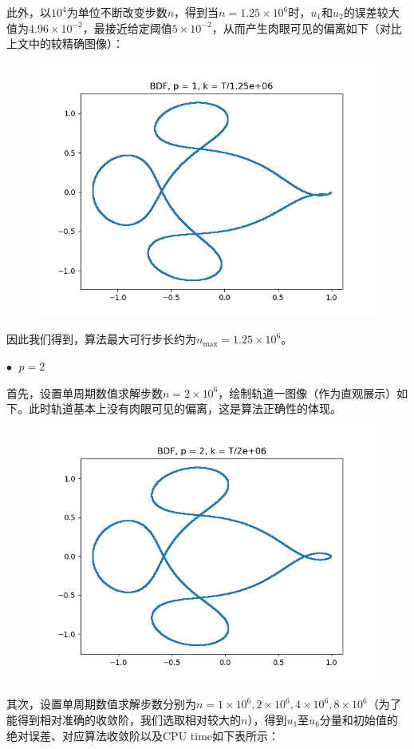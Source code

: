 \documentclass{ctexart}
\begin{document}
\begin{sloppypar}
此外，以$10^4$为单位不断改变步数$n$，得到当$n = 1.25 \times 10^6$时，$u_1$和$u_2$的误差较大值为$4.96 \times 10^{-2}$，最接近给定阈值$5 \times 10^{-2}$，从而产生肉眼可见的偏离如下（对比上文中的较精确图像）：
\begin{figure}[H]
\centering
\includegraphics[scale = 0.45]{./report_src/Figure_18.png}
\end{figure}
因此我们得到，算法最大可行步长约为$n_{\max} = 1.25 \times 10^6$。

$\bullet \;$ $p = 2$

首先，设置单周期数值求解步数$n = 2 \times 10^6$，绘制轨道一图像（作为直观展示）如下。此时轨道基本上没有肉眼可见的偏离，这是算法正确性的体现。
\begin{figure}[H]
\centering
\includegraphics[scale = 0.45]{./report_src/Figure_19.png}
\end{figure}
其次，设置单周期数值求解步数分别为$n = 1 \times 10^6,2 \times 10^6,4 \times 10^6, 8 \times 10^6$（为了能得到相对准确的收敛阶，我们选取相对较大的$n$），得到$u_1$至$u_6$分量和初始值的绝对误差、对应算法收敛阶以及CPU time如下表所示：


\end{sloppypar}
\end{document}
